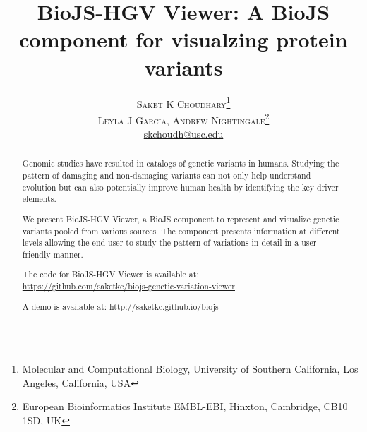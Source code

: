 \documentclass[twoside]{article}
\title{\vspace{-15mm}\fontsize{24pt}{10pt}\selectfont\textbf{BioJS-HGV Viewer: A BioJS component for visualzing protein variants}} %
\author{
\large
\textsc{Saket K Choudhary}\thanks{Molecular and Computational Biology, University of Southern California, Los Angeles, California, USA}\\[2mm] %
\textsc{Leyla J Garcia, Andrew Nightingale}\thanks{European Bioinformatics Institute EMBL-EBI, Hinxton, Cambridge, CB10 1SD, UK}\\[2mm] %
\normalsize \href{mailto:skchoudh@usc.edu}{skchoudh@usc.edu} %
\vspace{-5mm}
}
\date{}
\begin{document}
\maketitle %

\thispagestyle{fancy} %


\begin{abstract}

\noindent %

Genomic studies have resulted in  catalogs of genetic variants in humans. Studying the pattern of damaging and non-damaging variants can not only help understand evolution but can also potentially improve human health by identifying the key driver elements.

We present BioJS-HGV Viewer, a BioJS component to represent and visualize genetic variants pooled from various sources. The component presents information at different levels allowing the end user to study the pattern of variations in detail in a user friendly manner. 

The code for BioJS-HGV Viewer is available at:\\ \url{https://github.com/saketkc/biojs-genetic-variation-viewer}.

A demo is available at: \url{http://saketkc.github.io/biojs}

\end{abstract}

\end{document}
